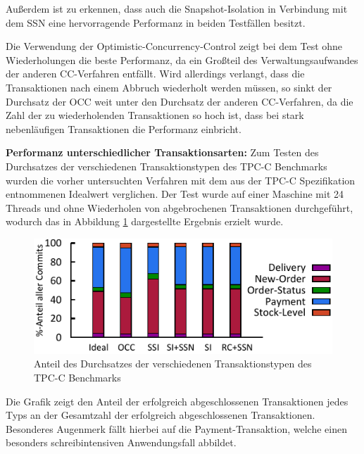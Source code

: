 Außerdem ist zu erkennen, dass auch die Snapshot-Isolation in Verbindung mit dem SSN eine hervorragende Performanz in beiden Testfällen besitzt.

Die Verwendung der Optimistic-Concurrency-Control zeigt bei dem Test ohne Wiederholungen die beste Performanz, da ein Großteil des Verwaltungsaufwandes der anderen CC-Verfahren entfällt.
Wird allerdings verlangt, dass die Transaktionen nach einem Abbruch wiederholt werden müssen, so sinkt der Durchsatz der OCC weit unter den Durchsatz der anderen CC-Verfahren, da die Zahl der zu wiederholenden Transaktionen so hoch ist, dass bei stark nebenläufigen Transaktionen die Performanz einbricht.

\textbf{Performanz unterschiedlicher Transaktionsarten:} Zum Testen des Durchsatzes der verschiedenen Transaktionstypen des TPC-C Benchmarks wurden die vorher untersuchten Verfahren mit dem aus der TPC-C Spezifikation entnommenen Idealwert verglichen.
Der Test wurde auf einer Maschine mit 24 Threads und ohne Wiederholen von abgebrochenen Transaktionen durchgeführt, wodurch das in Abbildung \ref{fig:breakdown} dargestellte Ergebnis erzielt wurde.

\begin{figure}
	\includegraphics[width=\columnwidth]{img/Figure_4.pdf}
	\caption{Anteil des Durchsatzes der verschiedenen Transaktionstypen des TPC-C Benchmarks}
	\label{fig:breakdown}
\end{figure}

Die Grafik zeigt den Anteil der erfolgreich abgeschlossenen Transaktionen jedes Typs an der Gesamtzahl der erfolgreich abgeschlossenen Transaktionen.
Besonderes Augenmerk fällt hierbei auf die Payment-Transaktion, welche einen besonders schreibintensiven Anwendungsfall abbildet.

